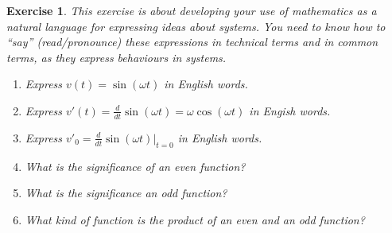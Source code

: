 \documentclass{book}
\newtheorem{exercise}{Exercise}
\begin{document}
\begin{solution}
\end{solution}

\begin{exercise} 
This exercise is about developing your use of mathematics as a natural
language for expressing ideas about systems. You need to know how to
``say'' (read/pronounce) these expressions in technical terms and in
common terms, as they express behaviours in systems.
\begin{enumerate}
\item Express $v(t) = \sin (\omega t)$ in English words.
\item Express $v'(t) = \frac{d}{dt}\sin(\omega t) = \omega \cos(\omega t)$ in Engish words.
\item Express $v'_0 =  \frac{d}{dt}\sin(\omega t)\Bigg|_{t=0}$ in English words.
\item What is the significance of an even function?
\item What is the significance an odd function?
\item What kind of function is the product of an even and an odd function?
\end{enumerate}
\end{exercise}
\begin{solution}
\end{solution}
\end{document}
